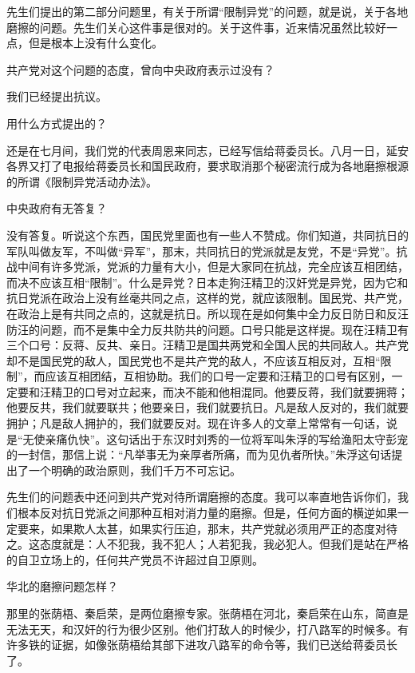 先生们提出的第二部分问题里，有关于所谓“限制异党”的问题，就是说，关于各地磨擦的问题。先生们关心这件事是很对的。关于这件事，近来情况虽然比较好一点，但是根本上没有什么变化。

共产党对这个问题的态度，曾向中央政府表示过没有？

我们已经提出抗议。

用什么方式提出的？

还是在七月间，我们党的代表周恩来同志，已经写信给蒋委员长。八月一日，延安各界又打了电报给蒋委员长和国民政府，要求取消那个秘密流行成为各地磨擦根源的所谓《限制异党活动办法》。

中央政府有无答复？

没有答复。听说这个东西，国民党里面也有一些人不赞成。你们知道，共同抗日的军队叫做友军，不叫做“异军”，那末，共同抗日的党派就是友党，不是“异党”。抗战中间有许多党派，党派的力量有大小，但是大家同在抗战，完全应该互相团结，而决不应该互相“限制”。什么是异党？日本走狗汪精卫的汉奸党是异党，因为它和抗日党派在政治上没有丝毫共同之点，这样的党，就应该限制。国民党、共产党，在政治上是有共同之点的，这就是抗日。所以现在是如何集中全力反日防日和反汪防汪的问题，而不是集中全力反共防共的问题。口号只能是这样提。现在汪精卫有三个口号：反蒋、反共、亲日。汪精卫是国共两党和全国人民的共同敌人。共产党却不是国民党的敌人，国民党也不是共产党的敌人，不应该互相反对，互相“限制”，而应该互相团结，互相协助。我们的口号一定要和汪精卫的口号有区别，一定要和汪精卫的口号对立起来，而决不能和他相混同。他要反蒋，我们就要拥蒋；他要反共，我们就要联共；他要亲日，我们就要抗日。凡是敌人反对的，我们就要拥护；凡是敌人拥护的，我们就要反对。现在许多人的文章上常常有一句话，说是“无使亲痛仇快”。这句话出于东汉时刘秀的一位将军叫朱浮的写给渔阳太守彭宠的一封信，那信上说：“凡举事无为亲厚者所痛，而为见仇者所快。”朱浮这句话提出了一个明确的政治原则，我们千万不可忘记。

先生们的问题表中还问到共产党对待所谓磨擦的态度。我可以率直地告诉你们，我们根本反对抗日党派之间那种互相对消力量的磨擦。但是，任何方面的横逆如果一定要来，如果欺人太甚，如果实行压迫，那末，共产党就必须用严正的态度对待之。这态度就是：人不犯我，我不犯人；人若犯我，我必犯人。但我们是站在严格的自卫立场上的，任何共产党员不许超过自卫原则。

华北的磨擦问题怎样？

那里的张荫梧、秦启荣，是两位磨擦专家。张荫梧在河北，秦启荣在山东，简直是无法无天，和汉奸的行为很少区别。他们打敌人的时候少，打八路军的时候多。有许多铁的证据，如像张荫梧给其部下进攻八路军的命令等，我们已送给蒋委员长了。

